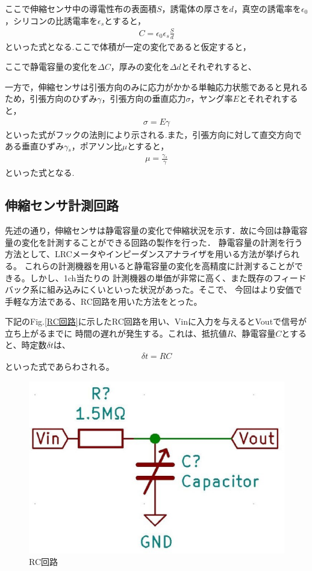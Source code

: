 \newpage

ここで伸縮センサ中の導電性布の表面積$S$，誘電体の厚さを$d$，真空の誘電率を$\epsilon{}_0$，シリコンの比誘電率を$\epsilon{}_s$とすると，
\begin{eqnarray}
    C=\epsilon{}_0\epsilon{}_s\frac{S}{d}
\end{eqnarray}
といった式となる.ここで体積が一定の変化であると仮定すると，

ここで静電容量の変化を$\Delta{}C$，厚みの変化を$\Delta{}d$とそれぞれすると、

一方で，伸縮センサは引張方向のみに応力がかかる単軸応力状態であると見れるため，引張方向のひずみ$\gamma$，引張方向の垂直応力$\sigma$，ヤング率$E$とそれぞれすると，
\begin{eqnarray}
    \sigma=E\gamma
    \label{フックの法則}
\end{eqnarray}
といった式がフックの法則により示される.また，引張方向に対して直交方向である垂直ひずみ$\gamma{}_s$，ポアソン比$\mu$とすると，
\begin{eqnarray}
    \mu = \frac{\gamma{}_s}{\gamma}
    \label{ポアソン比}
\end{eqnarray}
といった式となる.

\subsection{伸縮センサ計測回路}
先述の通り，伸縮センサは静電容量の変化で伸縮状況を示す．故に今回は静電容量の変化を計測することができる回路の製作を行った．
静電容量の計測を行う方法として、LRCメータやインピーダンスアナライザを用いる方法が挙げられる。
これらの計測機器を用いると静電容量の変化を高精度に計測することができる。しかし、1ch当たりの
計測機器の単価が非常に高く、また既存のフィードバック系に組み込みにくいといった状況があった。そこで、
今回はより安価で手軽な方法である、RC回路を用いた方法をとった。

下記のFig.\ref{RC回路}に示したRC回路を用い、Vinに入力を与えるとVoutで信号が立ち上がるまでに
時間の遅れが発生する。これは、抵抗値$R$、静電容量$C$とすると、時定数$\delta t$は、
\begin{eqnarray}
    \delta t = RC
\end{eqnarray}
といった式であらわされる。

\begin{figure}[h]
 \begin{center}
  \includegraphics[width=0.5\columnwidth,clip]{Photo/2.実験方法/RC.eps}
  \caption{RC回路}
  \label{RC}
 \end{center}
\end{figure}

